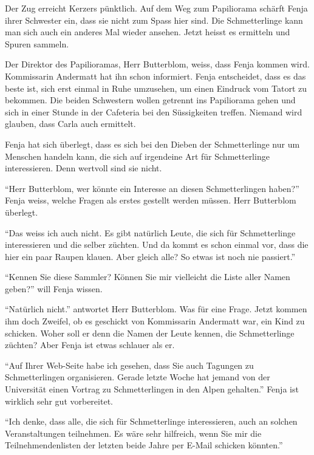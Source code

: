 \begin{center}
\end{center}
Der Zug erreicht Kerzers pünktlich. Auf dem Weg zum Papiliorama schärft Fenja ihrer Schwester ein, dass sie nicht zum Spass hier sind. Die Schmetterlinge kann man sich auch ein anderes Mal wieder ansehen. Jetzt heisst es ermitteln und Spuren sammeln.

Der Direktor des Papilioramas, Herr Butterblom, weiss, dass Fenja kommen wird. Kommissarin Andermatt hat ihn schon informiert. Fenja entscheidet, dass es das beste ist, sich erst einmal in Ruhe umzusehen, um einen Eindruck vom Tatort zu bekommen. Die beiden Schwestern wollen getrennt ins Papiliorama gehen und sich in einer Stunde in der Cafeteria bei den Süssigkeiten treffen. Niemand wird glauben, dass Carla auch ermittelt.

Fenja hat sich überlegt, dass es sich bei den Dieben der Schmetterlinge nur um Menschen handeln kann, die sich auf irgendeine Art für Schmetterlinge interessieren. Denn wertvoll sind sie nicht.  

\enquote{Herr Butterblom, wer könnte ein Interesse an diesen Schmetterlingen haben?} Fenja weiss, welche Fragen als erstes gestellt werden müssen. Herr Butterblom überlegt.

\enquote{Das weiss ich auch nicht. Es gibt natürlich Leute, die sich für Schmetterlinge interessieren und die selber züchten. Und da kommt es schon einmal vor, dass die hier ein paar Raupen klauen. Aber gleich alle? So etwas ist noch nie passiert.} 

\enquote{Kennen Sie diese Sammler? Können Sie mir vielleicht die Liste aller Namen geben?} will Fenja wissen.

\enquote{Natürlich nicht.} antwortet Herr Butterblom. Was für eine Frage. Jetzt kommen ihm doch Zweifel, ob es geschickt von Kommissarin Andermatt war, ein Kind zu schicken. Woher soll er denn die Namen der Leute kennen, die Schmetterlinge züchten? Aber Fenja ist etwas schlauer als er.

\enquote{Auf Ihrer Web-Seite habe ich gesehen, dass Sie auch Tagungen zu Schmetterlingen organisieren. Gerade letzte Woche hat jemand von der Universität einen Vortrag zu Schmetterlingen in den Alpen gehalten.} Fenja ist wirklich sehr gut vorbereitet. 

\enquote{Ich denke, dass alle, die sich für Schmetterlinge interessieren, auch
an solchen Veranstaltungen teilnehmen. Es wäre sehr hilfreich, wenn Sie mir die
Teilnehmendenlisten der letzten beide Jahre per E-Mail schicken könnten.}

